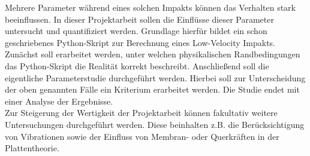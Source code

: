 Mehrere Parameter während eines solchen Impakts können das Verhalten stark beeinflussen. In dieser Projektarbeit sollen die Einflüsse dieser Parameter untersucht und quantifiziert werden. Grundlage hierfür bildet ein schon geschriebenes Python-Skript zur Berechnung eines Low-Velocity Impakts. Zunächst soll erarbeitet werden, unter welchen physikalischen Randbedingungen das Python-Skript die Realität korrekt beschreibt. Anschließend soll die eigentliche Parameterstudie durchgeführt werden. Hierbei soll zur Unterscheidung der oben genannten Fälle ein Kriterium erarbeitet werden. Die Studie endet mit einer Analyse der Ergebnisse.\\
Zur Steigerung der Wertigkeit der Projektarbeit können fakultativ weitere Untersuchungen durchgeführt werden. Diese beinhalten z.B. die Berücksichtigung von Vibrationen sowie der Einfluss von Membran- oder Querkräften in der Plattentheorie.\\

	

